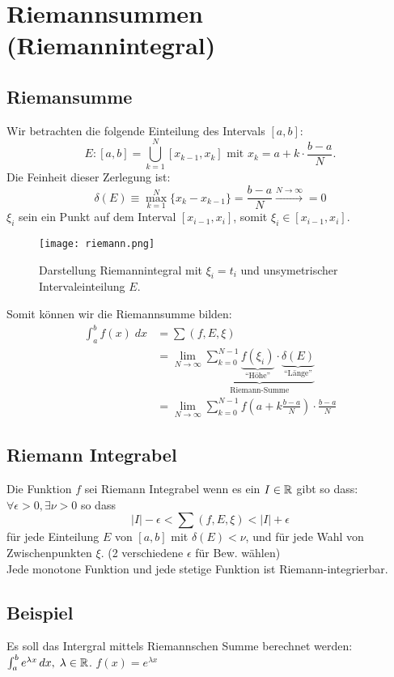 \section{Riemannsummen (Riemannintegral)}
\subsection{Riemansumme}
Wir betrachten die folgende Einteilung des Intervals $[a,b]$:\[
E: [a,b] = \bigcup_{k=1}^{N}[x_{k-1}, x_k] \text{ mit } x_k = a + k \cdot \frac{b-a}{N}.
\]
Die Feinheit dieser Zerlegung ist:\[
\delta(E) \equiv \max_{k=1}^{N}\{x_k - x_{k-1}\} = \frac{b-a}{N} \xrightarrow{N \to \infty} = 0
\]
$\xi_i$ sein ein Punkt auf dem Interval $[x_{i-1}, x_i]$, somit $\xi_i \in[x_{i-1}, x_i]$.\\

\begin{figure}
	\texttt{[image: riemann.png]}
	\caption[Bildunterschrift]{Darstellung Riemannintegral mit $\xi_i = t_i$ und unsymetrischer Intervaleinteilung $E$.}
\end{figure}

Somit können wir die Riemannsumme bilden:
\begin{align*}
\int_a^b f(x)\;dx &=\sum (f,E,\xi)\\
&= \lim_{N \to \infty} \underbrace{\sum_{k=0}^{N-1}
\underbrace{f(\xi_i)}_{\text{``Höhe''}} \cdot
\underbrace{\delta(E)}_{\text{``Länge''}}}_{\text{Riemann-Summe}}\\
&= \lim_{N \to \infty} \sum_{k=0}^{N-1} {f(a +
k\frac{b-a}{N})} \cdot \frac{b-a}{N}
\end{align*}


\subsection{Riemann Integrabel}
Die Funktion $f$ sei Riemann Integrabel wenn es ein $I \in \mathbb{R}$ gibt so dass: $\forall \epsilon > 0, \exists \nu > 0$ so dass \[
|I| - \epsilon < \sum (f,E,\xi) < |I| + \epsilon
\]
für jede Einteilung $E$ von $[a,b]$ mit $\delta(E) < \nu$, und für jede Wahl von Zwischenpunkten $\xi$. (2 verschiedene $\epsilon$ für Bew. wählen)\\
Jede monotone Funktion und jede stetige Funktion ist Riemann-integrierbar.
\subsection{Beispiel}
Es soll das Intergral mittels Riemannschen Summe berechnet werden: $\int_a^b
e^{\lambda x}\,dx, \; \lambda \in \mathbb{R}$. $f(x) = e^{\lambda x}$

